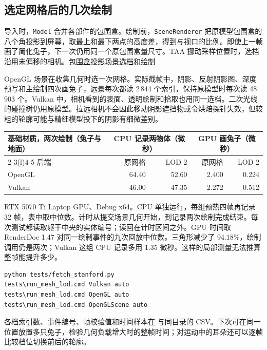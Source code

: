 \clearpage
\subsection{选定网格后的几次绘制}

导入时，\texttt{Model} 合并各部件的包围盒。绘制前，\texttt{SceneRenderer} 把原模型包围盒的八个角投影到屏幕，取最上和最下两点的高度差，得到与视口的比例。即使上一帧画了简化兔子，下一次仍用同一个原包围盒量尺寸。TAA 挪动采样位置时，选档沿用未偏移的相机。\href{run:../../Redflag/src/Redflag/Renderer/Model.cpp}{包围盒投影}\quad\href{run:../../Redflag/src/Redflag/Renderer/SceneRenderer.cpp}{场景选档和绘制}

OpenGL 场景在收集几何时选一次网格。实际截帧中，阴影、反射阴影图、深度预写和主绘制四次画兔子，远景每次都读 2\,844 个索引，保持原模型时每次读 48\,903 个。Vulkan 中，相机看到的表面、透明绘制和拾取也用同一选档。二次光线的碰撞树仍用原模型。拉远相机不会因此移动阴影遮挡物或令烘焙探针失效，但较粗的轮廓可能与精细模型投下的阴影有细微差别。

{\smalltable\noindent\begin{tabularx}{\linewidth}{@{}Xrrrr@{}}\toprule
基础材质，两次绘制（兔子与地面） & \multicolumn{2}{c}{CPU 记录两物体（微秒）}&\multicolumn{2}{c}{GPU 画兔子（微秒）}\\
\cmidrule(lr){2-3}\cmidrule(l){4-5}
后端 & 原网格 & LOD 2 & 原网格 & LOD 2\\\midrule
OpenGL & 64.40 & 52.60 & 2.400 & 0.224\\
Vulkan & 46.00 & 47.35 & 2.272 & 0.512\\\bottomrule
\end{tabularx}\par}

RTX 5070 Ti Laptop GPU、Debug x64。CPU 单独运行，每组预热四帧再记录 32 帧，表中取中位数。计时从提交场景几何开始，到记录两次绘制完成结束。每次测试都读取躯干中央的实体编号；读回在计时区间之外。GPU 时间取 RenderDoc 1.47 对同一绘制事件的九次回放中位数。三角形减少了 94.18\%，绘制调用仍是两次；Vulkan 这组 CPU 记录多用 1.35 微秒。这样的局部测量无法推算整帧能提升多少。

\begin{lstlisting}
python tests/fetch_stanford.py
tests\run_mesh_lod.cmd Vulkan auto
tests\run_mesh_lod.cmd OpenGL auto
tests\run_mesh_lod.cmd OpenGLScene auto
\end{lstlisting}
各档索引数、事件编号、帧校验值和时间样本在  与同目录的 CSV。下次可在同一位置放置多只兔子，检验几何负载增大时的整帧时间；对运动中的耳朵还可以逐帧比较档位切换前后的轮廓。
